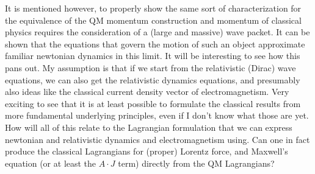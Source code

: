 \documentclass{article}
\begin{document}
It is mentioned however, to properly show the same sort of characterization for the 
equivalence of the QM momentum construction and momentum of classical
physics requires the consideration of a (large and massive) wave packet.  It can be shown that the equations that
govern the motion
of such an object approximate familiar newtonian dynamics in this limit.  It will be interesting to see how
this pans out.  My assumption is that if we start from the relativistic (Dirac) wave equations, we can also
get the relativistic dynamics equations, and presumably also ideas like the classical current density vector
of electromagnetism.  Very exciting to see that it is at least possible to formulate the classical results from
more fundamental underlying principles, even if I don't know what those are yet.  How will all of this relate 
to the Lagrangian formulation that we can express newtonian and relativistic dynamics and electromagnetism using.
Can one in fact produce the classical Lagrangians for (proper) Lorentz force, and Maxwell's equation (or at least the $A \cdot J$ term) directly from the QM Lagrangians?

%
%
\end{document}
